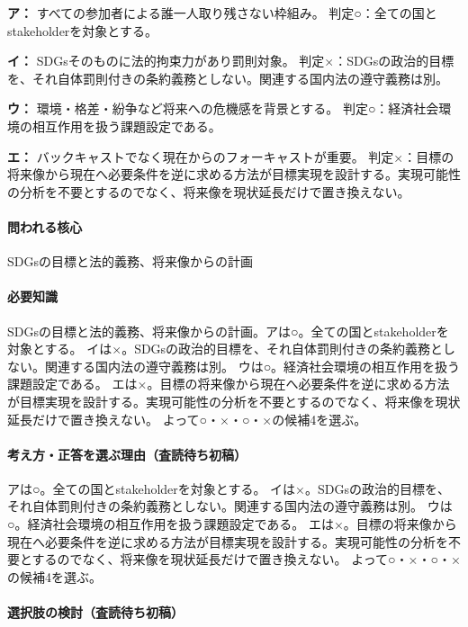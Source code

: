 \noindent\textbf{ア：} すべての参加者による誰一人取り残さない枠組み。 判定○：全ての国とstakeholderを対象とする。\par

\noindent\textbf{イ：} SDGsそのものに法的拘束力があり罰則対象。 判定×：SDGsの政治的目標を、それ自体罰則付きの条約義務としない。関連する国内法の遵守義務は別。\par

\noindent\textbf{ウ：} 環境・格差・紛争など将来への危機感を背景とする。 判定○：経済社会環境の相互作用を扱う課題設定である。\par

\noindent\textbf{エ：} バックキャストでなく現在からのフォーキャストが重要。 判定×：目標の将来像から現在へ必要条件を逆に求める方法が目標実現を設計する。実現可能性の分析を不要とするのでなく、将来像を現状延長だけで置き換えない。\par

\paragraph{問われる核心} SDGsの目標と法的義務、将来像からの計画

\paragraph{必要知識} SDGsの目標と法的義務、将来像からの計画。アは○。全ての国とstakeholderを対象とする。 イは×。SDGsの政治的目標を、それ自体罰則付きの条約義務としない。関連する国内法の遵守義務は別。 ウは○。経済社会環境の相互作用を扱う課題設定である。 エは×。目標の将来像から現在へ必要条件を逆に求める方法が目標実現を設計する。実現可能性の分析を不要とするのでなく、将来像を現状延長だけで置き換えない。 よって○・×・○・×の候補4を選ぶ。

\paragraph{考え方・正答を選ぶ理由（査読待ち初稿）} アは○。全ての国とstakeholderを対象とする。 イは×。SDGsの政治的目標を、それ自体罰則付きの条約義務としない。関連する国内法の遵守義務は別。 ウは○。経済社会環境の相互作用を扱う課題設定である。 エは×。目標の将来像から現在へ必要条件を逆に求める方法が目標実現を設計する。実現可能性の分析を不要とするのでなく、将来像を現状延長だけで置き換えない。 よって○・×・○・×の候補4を選ぶ。

\paragraph{選択肢の検討（査読待ち初稿）}\mbox{}\par

